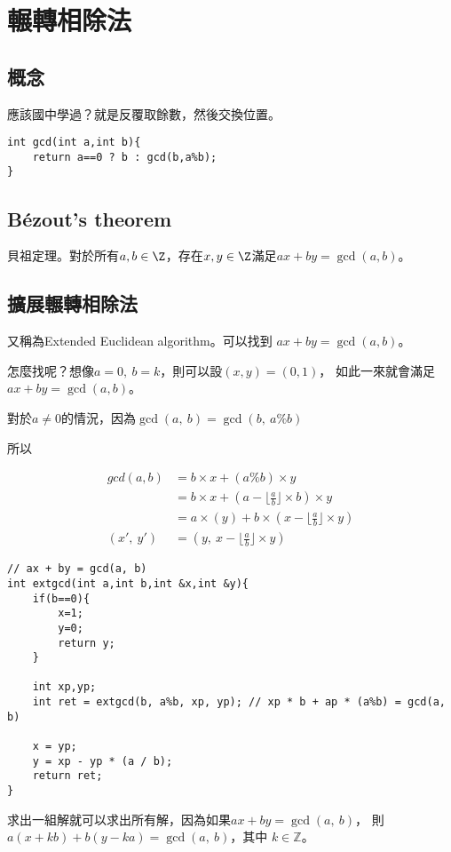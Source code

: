 \section{輾轉相除法}
    \subsection{概念}
    應該國中學過？就是反覆取餘數，然後交換位置。

\begin{lstlisting}[caption=GCD]
int gcd(int a,int b){
    return a==0 ? b : gcd(b,a%b);
}
\end{lstlisting}

    \subsection{Bézout's theorem}
    貝祖定理。對於所有$a, b \in \Z$，存在$x,y \in \Z$滿足$ax + by = \gcd(a,b)$。

    \subsection{擴展輾轉相除法}
    又稱為Extended Euclidean algorithm。可以找到
    $ax + by = \gcd(a,b)$。

    怎麼找呢？想像$a = 0,\ b = k$，則可以設$(x,y) = (0,1)$，
    如此一來就會滿足$ax + by = \gcd(a,b)$。

    對於$a \ne 0$的情況，因為$\gcd(a,\ b) = \gcd(b,\ a \% b)$
    
    所以
    
    \begin{align*}
        gcd(a, b) &= b \times x + (a \% b) \times y \\
        &= b \times x + (a - \lfloor \frac{a}{b}\rfloor \times b) \times y \\
        &= a \times (y) + b \times (x - \lfloor \frac{a}{b}\rfloor \times y) \\
        (x',\ y') &= (y,\ x - \lfloor\frac{a}{b}\rfloor\times y)
    \end{align*}

\begin{lstlisting}[caption=EXT GCD]
    // ax + by = gcd(a, b)
int extgcd(int a,int b,int &x,int &y){
    if(b==0){
        x=1;
        y=0;
        return y;
    }
    
    int xp,yp;
    int ret = extgcd(b, a%b, xp, yp); // xp * b + ap * (a%b) = gcd(a, b)
    
    x = yp;
    y = xp - yp * (a / b);
    return ret;
}
\end{lstlisting}

    求出一組解就可以求出所有解，因為如果$ax + by = \gcd(a,\ b)$，
    則$a(x + kb) + b(y - ka) = \gcd(a,\ b)$，其中
    $k \in \mathbb{Z}$。

    